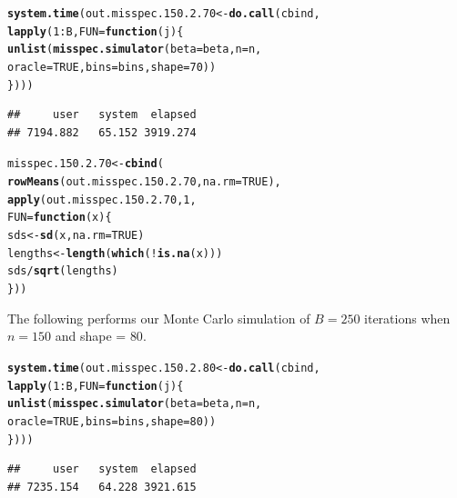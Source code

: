 \documentclass[11pt]{article}\usepackage[]{graphicx}\usepackage[]{color}
\makeatletter
\newcommand{\hlnum}[1]{\textcolor[rgb]{0.686,0.059,0.569}{#1}}%
\newcommand{\hlopt}[1]{\textcolor[rgb]{0,0,0}{#1}}%
\newcommand{\hlstd}[1]{\textcolor[rgb]{0.345,0.345,0.345}{#1}}%
\newcommand{\hlkwa}[1]{\textcolor[rgb]{0.161,0.373,0.58}{\textbf{#1}}}%
\newcommand{\hlkwb}[1]{\textcolor[rgb]{0.69,0.353,0.396}{#1}}%
\newcommand{\hlkwc}[1]{\textcolor[rgb]{0.333,0.667,0.333}{#1}}%
\newcommand{\hlkwd}[1]{\textcolor[rgb]{0.737,0.353,0.396}{\textbf{#1}}}%
\newenvironment{kframe}{%
 \def\at@end@of@kframe{}%
 \ifinner\ifhmode%
  \def\at@end@of@kframe{\end{minipage}}%
  \begin{minipage}{\columnwidth}%
 \fi\fi%
 \def\FrameCommand##1{\hskip\@totalleftmargin \hskip-\fboxsep
 \colorbox{shadecolor}{##1}\hskip-\fboxsep
     \hskip-\linewidth \hskip-\@totalleftmargin \hskip\columnwidth}%
 \MakeFramed {\advance\hsize-\width
   \@totalleftmargin\z@ \linewidth\hsize
   \@setminipage}}%
 {\par\unskip\endMakeFramed%
 \at@end@of@kframe}
\newenvironment{knitrout}{}{} %
\makeatother
\begin{document}
\begin{knitrout}
\color{fgcolor}\begin{kframe}
\begin{alltt}
\hlkwd{system.time}\hlstd{(out.misspec.150.2.70} \hlkwb{<-} \hlkwd{do.call}\hlstd{(cbind,}
  \hlkwd{lapply}\hlstd{(}\hlnum{1}\hlopt{:}\hlstd{B,} \hlkwc{FUN} \hlstd{=} \hlkwa{function}\hlstd{(}\hlkwc{j}\hlstd{)\{}
    \hlkwd{unlist}\hlstd{(}\hlkwd{misspec.simulator}\hlstd{(}\hlkwc{beta} \hlstd{= beta,} \hlkwc{n} \hlstd{= n,}
      \hlkwc{oracle} \hlstd{=} \hlnum{TRUE}\hlstd{,} \hlkwc{bins} \hlstd{= bins,} \hlkwc{shape} \hlstd{=} \hlnum{70}\hlstd{))}
\hlstd{\})))}
\end{alltt}
\begin{verbatim}
##     user   system  elapsed 
## 7194.882   65.152 3919.274
\end{verbatim}
\end{kframe}
\end{knitrout}

\begin{knitrout}
\color{fgcolor}\begin{kframe}
\begin{alltt}
\hlstd{misspec.150.2.70} \hlkwb{<-} \hlkwd{cbind}\hlstd{(}
  \hlkwd{rowMeans}\hlstd{(out.misspec.150.2.70,} \hlkwc{na.rm} \hlstd{=} \hlnum{TRUE}\hlstd{),}
  \hlkwd{apply}\hlstd{(out.misspec.150.2.70,} \hlnum{1}\hlstd{,}
  \hlkwc{FUN} \hlstd{=} \hlkwa{function}\hlstd{(}\hlkwc{x}\hlstd{)\{}
    \hlstd{sds} \hlkwb{<-} \hlkwd{sd}\hlstd{(x,} \hlkwc{na.rm} \hlstd{=} \hlnum{TRUE}\hlstd{)}
    \hlstd{lengths} \hlkwb{<-} \hlkwd{length}\hlstd{(}\hlkwd{which}\hlstd{(}\hlopt{!}\hlkwd{is.na}\hlstd{(x)))}
    \hlstd{sds} \hlopt{/} \hlkwd{sqrt}\hlstd{(lengths)}
  \hlstd{\}))}
\end{alltt}
\end{kframe}
\end{knitrout}

The following performs our Monte Carlo simulation of $B = 250$ iterations 
when $n = 150$ and shape = $80$.

\begin{knitrout}
\color{fgcolor}\begin{kframe}
\begin{alltt}
\hlkwd{system.time}\hlstd{(out.misspec.150.2.80} \hlkwb{<-} \hlkwd{do.call}\hlstd{(cbind,}
  \hlkwd{lapply}\hlstd{(}\hlnum{1}\hlopt{:}\hlstd{B,} \hlkwc{FUN} \hlstd{=} \hlkwa{function}\hlstd{(}\hlkwc{j}\hlstd{)\{}
    \hlkwd{unlist}\hlstd{(}\hlkwd{misspec.simulator}\hlstd{(}\hlkwc{beta} \hlstd{= beta,} \hlkwc{n} \hlstd{= n,}
      \hlkwc{oracle} \hlstd{=} \hlnum{TRUE}\hlstd{,} \hlkwc{bins} \hlstd{= bins,} \hlkwc{shape} \hlstd{=} \hlnum{80}\hlstd{))}
\hlstd{\})))}
\end{alltt}
\begin{verbatim}
##     user   system  elapsed 
## 7235.154   64.228 3921.615
\end{verbatim}
\end{kframe}
\end{knitrout}
\end{document}
